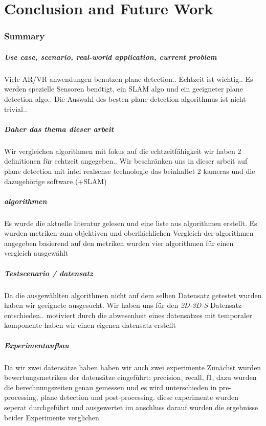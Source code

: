 \documentclass[main.tex]{subfiles}
\begin{document}
\chapter{Conclusion and Future Work}
\label{chap:concl}
\subsection{Summary}

\paragraph{Use case, scenario, real-world application, current problem}
Viele AR/VR anwendungen benutzen plane detection..
Echtzeit ist wichtig..
Es werden spezielle Sensoren benötigt, ein SLAM algo und ein geeigneter plane detection algo..
Die Auswahl des besten plane detection algorithmus ist nicht trivial..

\paragraph{Daher das thema dieser arbeit}
Wir vergleichen algorithmen mit fokus auf die echtzeitfähigkeit
wir haben 2 definitionen für echtzeit angegeben..
Wir beschränken uns in dieser arbeit auf plane detection mit intel realsense technologie
 das beinhaltet 2 kameras und die dazugehörige software (+SLAM)

\paragraph{algorithmen}
Es wurde die aktuelle literatur gelesen und eine liste aus algorithmen erstellt.
Es wurden metriken zum objektiven und oberflächlichen Vergleich der algorithmen angegeben
basierend auf den metriken wurden vier algorithmen für einen vergleich ausgewählt

\paragraph{Testscenario / datensatz}
Da die ausgewählten algorithmen nicht auf dem selben Datensatz getestet wurden haben wir 
geeignete ausgesucht.
Wir haben uns für den \textit{2D-3D-S} Datensatz entschieden..
motiviert durch die abwesenheit eines datensatzes mit temporaler komponente
 haben wir einen eigenen datensatz erstellt

\paragraph{Experimentaufbau}
Da wir zwei datensätze haben haben wir auch zwei experimente
Zunächst wurden bewertungsmetriken der datensätze eingeführt:
precision, recall, f1, 
dazu wurden die berechnungszeiten genau gemessen und es wird unterschieden in pre-processing,
plane detection und post-processing. 
diese experimente wurden seperat durchgeführt und ausgewertet
im anschluss darauf wurden die ergebnisse beider Experimente verglichen
\end{document}
